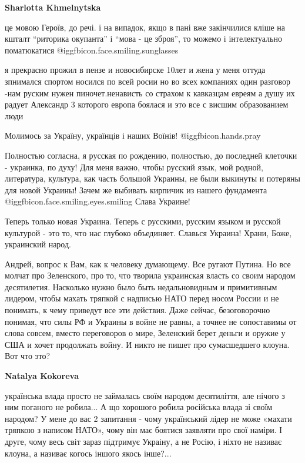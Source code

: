 \begin{itemize}
\begin{itemize}
\textbf{Sharlotta Khmelnytska} 

це мовою Героїв, до речі. і на випадок, якщо в пані вже закінчилися кліше на
кшталт \enquote{риторика окупанта} і \enquote{мова - це зброя}, то можемо і інтелектуально
поматюкатися  @igg{fbicon.face.smiling.sunglasses} 

\end{itemize} %


я прекрасно прожил в пензе и новосибирске 10лет и жена у меня оттуда зпнимался
спортом носился по всей росии но во всех компаниях один разговор -нам руским
нужен пиночет.ненависть со страхом к кавказцам евреям а душу их радует
Александр 3 которого европа боялася и это все с висшим образованием люди


Молимось за Україну, українців і наших Воїнів!  @igg{fbicon.hands.pray} 


Полностью согласна, я русская по рождению, полностью, до последней клеточки -
украинка, по духу! Для меня важно, чтобы русский язык, мой родной, литература,
культура, как часть большой Украины, не были выкинуты и потеряны для новой
Украины! Зачем же выбивать кирпичик из нашего фундамента  @igg{fbicon.face.smiling.eyes.smiling}  Слава Украине!



Теперь только новая Украина. Теперь с русскими, русским языком и русской
культурой - это то, что нас глубоко объединяет. Славься Украина! Храни, Боже,
украинский народ.


Андрей, вопрос к Вам, как к человеку думающему. Все ругают Путина. Но все
молчат про Зеленского, про то, что творила украинская власть со своим народом
десятилетия. Насколько нужно было быть недальновидным и примитивным лидером,
чтобы махать тряпкой с надписью НАТО перед носом России и не понимать, к чему
приведут все эти действия. Даже сейчас, безоговорочно понимая, что силы РФ и
Украины в войне не равны, а точнее не сопоставимы от слова совсем, вместо
переговоров о мире, Зеленский берет деньги и оружие у США и хочет продолжать
войну. И никто не пишет про сумасшедшего клоуна. Вот что это?

\begin{itemize} %
\textbf{Natalya Kokoreva} 

українська влада просто не займалась своїм народом десятиліття, але нічого з
ним поганого не робила... А що хорошого робила російська влада зі своїм народом?
У мене до вас 2 запитання - чому український лідер не може «махати тряпкою з
написом НАТО», чому він має боятися заявляти про свої наміри. І друге, чому
весь світ зараз підтримує Украіну, а не Росію, і ніхто не називає клоуна, а
називає когось іншого якось інше?...


\end{itemize}
\end{itemize}
